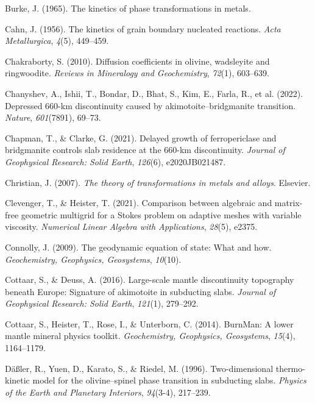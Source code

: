 \documentclass[draft,linenumbers]{agujournal2019}
\newlength{\cslhangindent}
\newenvironment{CSLReferences}[2]
 {\begin{list}{}{
  \setlength{\itemindent}{0pt}
  \setlength{\leftmargin}{0pt}
  \setlength{\parsep}{0pt}
  \ifodd #1
   \setlength{\leftmargin}{\cslhangindent}
   \setlength{\itemindent}{-\cslhangindent}
  \fi
  \setlength{\itemsep}{#2\baselineskip}
  }
  \item\relax}
 {\end{list}}
\begin{document}
\begin{CSLReferences}{1}{0}
Burke, J. (1965). The kinetics of phase transformations in metals.

Cahn, J. (1956). The kinetics of grain boundary nucleated reactions.
\emph{Acta Metallurgica}, \emph{4}(5), 449--459.

Chakraborty, S. (2010). Diffusion coefficients in olivine, wadsleyite
and ringwoodite. \emph{Reviews in Mineralogy and Geochemistry},
\emph{72}(1), 603--639.

{Chanyshev, A., Ishii, T., Bondar, D., Bhat, S., Kim, E., Farla, R., et
al.} (2022). Depressed 660-km discontinuity caused by
akimotoite--bridgmanite transition. \emph{Nature}, \emph{601}(7891),
69--73.

Chapman, T., \& Clarke, G. (2021). Delayed growth of ferropericlase and
bridgmanite controls slab residence at the 660-km discontinuity.
\emph{Journal of Geophysical Research: Solid Earth}, \emph{126}(6),
e2020JB021487.

Christian, J. (2007). \emph{The theory of transformations in metals and
alloys}. Elsevier.

Clevenger, T., \& Heister, T. (2021). Comparison between algebraic and
matrix-free geometric multigrid for a {Stokes} problem on adaptive
meshes with variable viscosity. \emph{Numerical Linear Algebra with
Applications}, \emph{28}(5), e2375.

Connolly, J. (2009). The geodynamic equation of state: What and how.
\emph{Geochemistry, Geophysics, Geosystems}, \emph{10}(10).

Cottaar, S., \& Deuss, A. (2016). Large-scale mantle discontinuity
topography beneath {Europe}: Signature of akimotoite in subducting
slabs. \emph{Journal of Geophysical Research: Solid Earth},
\emph{121}(1), 279--292.

Cottaar, S., Heister, T., Rose, I., \& Unterborn, C. (2014). {BurnMan}:
A lower mantle mineral physics toolkit. \emph{Geochemistry, Geophysics,
Geosystems}, \emph{15}(4), 1164--1179.

Däßler, R., Yuen, D., Karato, S., \& Riedel, M. (1996). Two-dimensional
thermo-kinetic model for the olivine--spinel phase transition in
subducting slabs. \emph{Physics of the Earth and Planetary Interiors},
\emph{94}(3-4), 217--239.


\end{CSLReferences}
\end{document}
